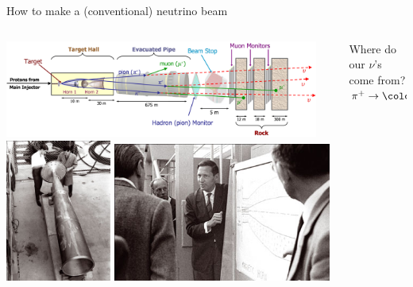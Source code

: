 %
%
%

\begin{frame}[t]{How to make a (conventional) neutrino beam}

\begin{columns}
  \begin{column}{0.78\textwidth}
    \centering
    \includegraphics[width=0.95\textwidth]{./images/3nu/accelerator/numi.png}\\
    \vspace{0.2cm}
    \includegraphics[width=0.32\textwidth]{./images/3nu/accelerator/beam_horn_old_1.jpg}
    \hfill
    \includegraphics[width=0.66\textwidth]{./images/3nu/accelerator/beam_horn_old_3.jpg}
  \end{column}
  \begin{column}{0.22\textwidth}
   \begin{block}{}
   {\scriptsize
    Where do our $\nu$'s come from?\\
    \vspace{0.3cm}
    $\pi^{+} \rightarrow {\color{red}\nu_{\mu}} + \mu^{+}$\\
}
\end{block}
\end{column}
\end{columns}
\end{frame}
